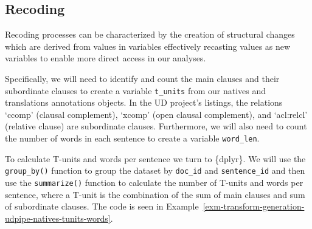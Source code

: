 \documentclass[
  letterpaper,
  krantz1]{latex/krantz-mod}
\theoremstyle{definition}
\theoremstyle{definition}
\theoremstyle{remark}
\begin{document}
\subsection{Recoding}\label{sec-transform-recoding}

Recoding processes can be characterized by the creation of structural
changes which are derived from values in variables effectively recasting
values as new variables to enable more direct access in our
analyses.

Specifically, we will need to identify and
count the main clauses and their subordinate clauses to create a
variable \texttt{t\_units} from our natives and translations annotations
objects. In the UD project's listings, the
relations `ccomp' (clausal complement), `xcomp' (open clausal
complement), and `acl:relcl' (relative clause) are subordinate clauses.
Furthermore, we will also need to count the number of words in each
sentence to create a variable \texttt{word\_len}.

To calculate T-units and words per sentence we turn to \{dplyr\}. We
will use the \texttt{group\_by()} function to group the dataset by
\texttt{doc\_id} and \texttt{sentence\_id} and then use the
\texttt{summarize()} function to calculate the number of T-units and
words per sentence, where a T-unit is the combination of the sum of main
clauses and sum of subordinate clauses. The code is seen in
Example~\ref{exm-transform-generation-udpipe-natives-tunits-words}.
\end{document}
